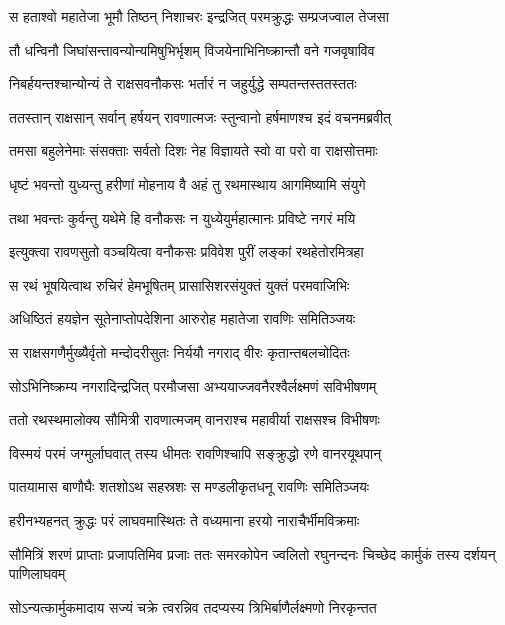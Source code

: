 
\twolineshloka
{स हताश्वो महातेजा भूमौ तिष्ठन् निशाचरः}
{इन्द्रजित् परमक्रुद्धः सम्प्रजज्वाल तेजसा} %

\twolineshloka
{तौ धन्विनौ जिघांसन्तावन्योन्यमिषुभिर्भृशम्}
{विजयेनाभिनिष्क्रान्तौ वने गजवृषाविव} %

\twolineshloka
{निबर्हयन्तश्चान्योन्यं ते राक्षसवनौकसः}
{भर्तारं न जहुर्युद्धे सम्पतन्तस्ततस्ततः} %

\twolineshloka
{ततस्तान् राक्षसान् सर्वान् हर्षयन् रावणात्मजः}
{स्तुन्वानो हर्षमाणश्च इदं वचनमब्रवीत्} %

\twolineshloka
{तमसा बहुलेनेमाः संसक्ताः सर्वतो दिशः}
{नेह विज्ञायते स्वो वा परो वा राक्षसोत्तमाः} %

\twolineshloka
{धृष्टं भवन्तो युध्यन्तु हरीणां मोहनाय वै}
{अहं तु रथमास्थाय आगमिष्यामि संयुगे} %

\twolineshloka
{तथा भवन्तः कुर्वन्तु यथेमे हि वनौकसः}
{न युध्येयुर्महात्मानः प्रविष्टे नगरं मयि} %

\twolineshloka
{इत्युक्त्वा रावणसुतो वञ्चयित्वा वनौकसः}
{प्रविवेश पुरीं लङ्कां रथहेतोरमित्रहा} %

\twolineshloka
{स रथं भूषयित्वाथ रुचिरं हेमभूषितम्}
{प्रासासिशरसंयुक्तं युक्तं परमवाजिभिः} %

\twolineshloka
{अधिष्ठितं हयज्ञेन सूतेनाप्तोपदेशिना}
{आरुरोह महातेजा रावणिः समितिञ्जयः} %

\twolineshloka
{स राक्षसगणैर्मुख्यैर्वृतो मन्दोदरीसुतः}
{निर्ययौ नगराद् वीरः कृतान्तबलचोदितः} %

\twolineshloka
{सोऽभिनिष्क्रम्य नगरादिन्द्रजित् परमौजसा}
{अभ्ययाज्जवनैरश्वैर्लक्ष्मणं सविभीषणम्} %

\twolineshloka
{ततो रथस्थमालोक्य सौमित्री रावणात्मजम्}
{वानराश्च महावीर्या राक्षसश्च विभीषणः} %

\twolineshloka
{विस्मयं परमं जग्मुर्लाघवात् तस्य धीमतः}
{रावणिश्चापि सङ्क्रुद्धो रणे वानरयूथपान्} %

\twolineshloka
{पातयामास बाणौघैः शतशोऽथ सहस्रशः}
{स मण्डलीकृतधनू रावणिः समितिञ्जयः} %

\twolineshloka
{हरीनभ्यहनत् क्रुद्धः परं लाघवमास्थितः}
{ते वध्यमाना हरयो नाराचैर्भीमविक्रमाः} %

\threelineshloka
{सौमित्रिं शरणं प्राप्ताः प्रजापतिमिव प्रजाः}
{ततः समरकोपेन ज्वलितो रघुनन्दनः}
{चिच्छेद कार्मुकं तस्य दर्शयन् पाणिलाघवम्} %

\twolineshloka
{सोऽन्यत्कार्मुकमादाय सज्यं चक्रे त्वरन्निव}
{तदप्यस्य त्रिभिर्बाणैर्लक्ष्मणो निरकृन्तत} %

